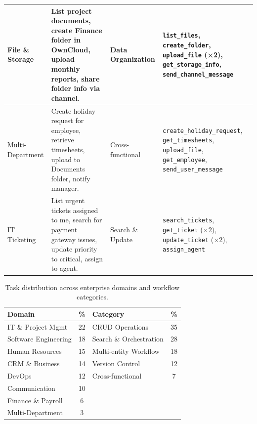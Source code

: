 \documentclass{article}
\theoremstyle{plain}
\theoremstyle{definition}
\theoremstyle{remark}
\begin{document}
\begin{table}[H]
\begin{tabular}{p{2.5cm} p{5.5cm} p{2.5cm} p{3.0cm}}
File \& Storage & List project documents, create Finance folder in OwnCloud, upload monthly reports, share folder info via channel. & Data Organization & \texttt{list\_files}, \texttt{create\_folder}, \texttt{upload\_file} (×2), \texttt{get\_storage\_info}, \texttt{send\_channel\_message} \\

\midrule

Multi-Department & Create holiday request for employee, retrieve timesheets, upload to Documents folder, notify manager. & Cross-functional & \texttt{create\_holiday\_request}, \texttt{get\_timesheets}, \texttt{upload\_file}, \texttt{get\_employee}, \texttt{send\_user\_message} \\

\midrule

IT Ticketing & List urgent tickets assigned to me, search for payment gateway issues, update priority to critical, assign to agent. & Search \& Update & \texttt{search\_tickets}, \texttt{get\_ticket} (×2), \texttt{update\_ticket} (×2), \texttt{assign\_agent} \\

\bottomrule
\end{tabular}
\end{table}


\begin{table}[h]
\centering
\small
\caption{Task distribution across enterprise domains and workflow categories.}
\label{tab:domain_dist}
\begin{tabular}{lc|lc}
\toprule
\textbf{Domain} & \textbf{\%} & \textbf{Category} & \textbf{\%} \\
\midrule
IT \& Project Mgmt & 22 & CRUD Operations & 35 \\
Software Engineering & 18 & Search \& Orchestration & 28 \\
Human Resources & 15 & Multi-entity Workflow & 18 \\
CRM \& Business & 14 & Version Control & 12 \\
DevOps & 12 & Cross-functional & 7 \\
Communication & 10 & & \\
Finance \& Payroll & 6 & & \\
Multi-Department & 3 & & \\
\bottomrule
\end{tabular}
\end{table}


\end{document}
